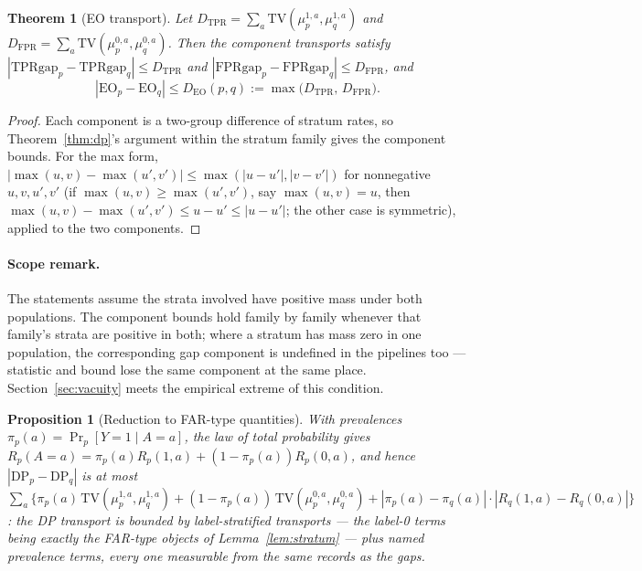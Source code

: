 \documentclass[11pt]{article}
\newtheorem{theorem}{Theorem}
\newtheorem{proposition}{Proposition}
\begin{document}
\begin{theorem}[EO transport]
\label{thm:eo}
Let $D_{\mathrm{TPR}} = \sum_a \mathrm{TV}(\mu_p^{1,a}, \mu_q^{1,a})$
and $D_{\mathrm{FPR}} = \sum_a \mathrm{TV}(\mu_p^{0,a}, \mu_q^{0,a})$.
Then the component transports satisfy
$|\mathrm{TPRgap}_p - \mathrm{TPRgap}_q| \le D_{\mathrm{TPR}}$ and
$|\mathrm{FPRgap}_p - \mathrm{FPRgap}_q| \le D_{\mathrm{FPR}}$, and
\[
|\mathrm{EO}_p - \mathrm{EO}_q| \le D_{\mathrm{EO}}(p,q) :=
\max\bigl(D_{\mathrm{TPR}},\, D_{\mathrm{FPR}}\bigr).
\]
\end{theorem}

\begin{proof}
Each component is a two-group difference of stratum rates, so
Theorem~\ref{thm:dp}'s argument within the stratum family gives
the component bounds. For the max form,
$|\max(u,v) - \max(u',v')| \le \max(|u-u'|, |v-v'|)$ for
nonnegative $u,v,u',v'$ (if $\max(u,v) \ge \max(u',v')$, say $\max(u,v) = u$, then $\max(u,v) - \max(u',v') \le u - u' \le |u-u'|$; the other case is symmetric), applied to
the two components.
\end{proof}

\paragraph{Scope remark.} The statements assume the strata
involved have positive mass under both populations. The component
bounds hold family by family whenever that family's strata are
positive in both; where a stratum has mass zero in one population,
the corresponding gap component is undefined in the pipelines too
--- statistic and bound lose the same component at the same place.
Section~\ref{sec:vacuity} meets the empirical extreme of this
condition.

\begin{proposition}[Reduction to FAR-type quantities]
\label{prop:reduction}
With prevalences $\pi_p(a) = \Pr_p[Y{=}1 \mid A{=}a]$, the law of
total probability gives
$R_p(A{=}a) = \pi_p(a) R_p(1,a) + (1-\pi_p(a)) R_p(0,a)$, and hence
$|\mathrm{DP}_p - \mathrm{DP}_q|$ is at most
$\sum_a \bigl\{ \pi_p(a)\,\mathrm{TV}(\mu_p^{1,a}, \mu_q^{1,a})
+ (1-\pi_p(a))\,\mathrm{TV}(\mu_p^{0,a}, \mu_q^{0,a})
+ |\pi_p(a) - \pi_q(a)| \cdot |R_q(1,a) - R_q(0,a)| \bigr\}$:
the DP transport is bounded by label-stratified transports --- the
label-0 terms being exactly the FAR-type objects of
Lemma~\ref{lem:stratum} --- plus named prevalence terms, every one measurable from the same records as the gaps.
\end{proposition}
\end{document}
